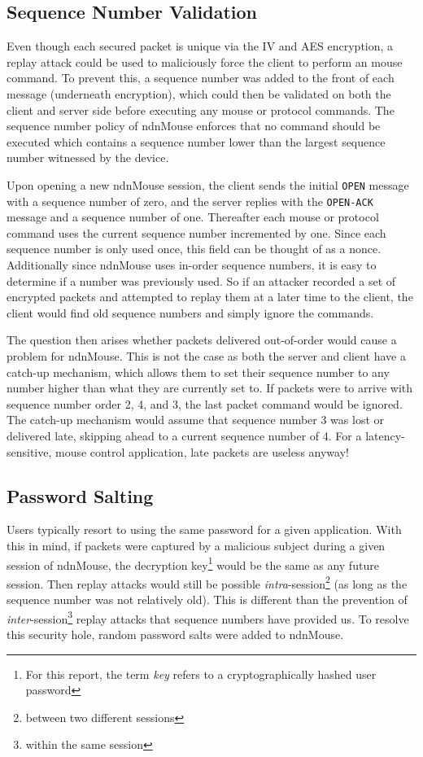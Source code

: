 \documentclass{sig-alternate}
\renewcommand\_{\textunderscore\allowbreak}  %
\begin{document}
\subsection{Sequence Number Validation}
Even though each secured packet is unique via the IV and AES encryption, a replay attack could be used to maliciously force the client to perform an mouse command. To prevent this, a sequence number was added to the front of each message (underneath encryption), which could then be validated on both the client and server side before executing any mouse or protocol commands. The sequence number policy of ndnMouse enforces that no command should be executed which contains a sequence number lower than the largest sequence number witnessed by the device. 

Upon opening a new ndnMouse session, the client sends the initial \texttt{OPEN} message with a sequence number of zero, and the server replies with the \texttt{OPEN-ACK} message and a sequence number of one. Thereafter each mouse or protocol command uses the current sequence number incremented by one. Since each sequence number is only used once, this field can be thought of as a nonce. Additionally since ndnMouse uses in-order sequence numbers, it is easy to determine if a number was previously used. So if an attacker recorded a set of encrypted packets and attempted to replay them at a later time to the client, the client would find old sequence numbers and simply ignore the commands.

The question then arises whether packets delivered out-of-order would cause a problem for ndnMouse. This is not the case as both the server and client have a catch-up mechanism, which allows them to set their sequence number to any number higher than what they are currently set to. If packets were to arrive with sequence number order 2, 4, and 3, the last packet command would be ignored. The catch-up mechanism would assume that sequence number 3 was lost or delivered late, skipping ahead to a current sequence number of 4. For a latency-sensitive, mouse control application, late packets are useless anyway!

\subsection{Password Salting}
Users typically resort to using the same password for a given application. With this in mind, if packets were captured by a malicious subject during a given session of ndnMouse, the decryption key\footnote{For this report, the term \textit{key} refers to a cryptographically hashed user password} would be the same as any future session. Then replay attacks would still be possible \textit{intra}-session\footnote{between two different sessions} (as long as the sequence number was not relatively old). This is different than the prevention of \textit{inter}-session\footnote{within the same session} replay attacks that sequence numbers have provided us. To resolve this security hole, random password salts were added to ndnMouse.
\end{document}
